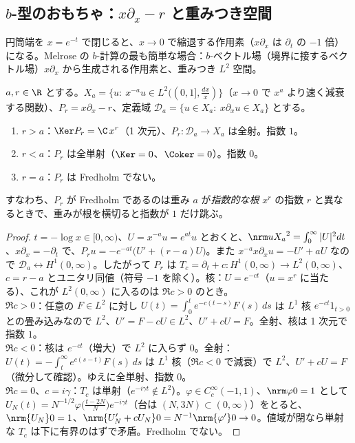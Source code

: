 \subsection{$b$-型のおもちゃ：$x\partial_x-r$ と重みつき空間}
円筒端を $x=e^{-t}$ で閉じると、$x\to0$ で縮退する作用素（$x\partial_x$ は $\partial_t$ の $-1$ 倍）になる。Melrose の $b$-計算の最も簡単な場合：$b$-ベクトル場（境界に接するベクトル場）$x\partial_x$ から生成される作用素と、重みつき $L^2$ 空間。
\begin{thm}\label{thm:toyb}\tP
$a,r\in\R$ とする。$X_a=\{u:\ x^{-a}u\in L^2((0,1],\tfrac{dx}x)\}$（$x\to0$ で $x^a$ より速く減衰する関数）、$P_r=x\partial_x-r$、定義域 $\mathcal D_a=\{u\in X_a:\ x\partial_xu\in X_a\}$ とする。
\begin{enumerate}
\item $r>a$：$\Ker P_r=\C\,x^r$（1 次元）、$P_r:\mathcal D_a\to X_a$ は全射。指数 $1$。
\item $r<a$：$P_r$ は全単射（$\Ker=0$、$\Coker=0$）。指数 $0$。
\item $r=a$：$P_r$ は Fredholm でない。
\end{enumerate}
すなわち、$P_r$ が Fredholm であるのは重み $a$ が\emph{指数的な根} $x^r$ の指数 $r$ と異なるときで、重みが根を横切ると指数が $1$ だけ跳ぶ。
\end{thm}
\begin{proof}
$t=-\log x\in[0,\infty)$、$U=x^{-a}u=e^{at}u$ とおくと、$\nrm u{X_a}^2=\int_0^\infty|U|^2dt$、$x\partial_x=-\partial_t$ で、$P_ru=-e^{-at}\bigl(U'+(r-a)U\bigr)$。また $x^{-a}x\partial_xu=-U'+aU$ なので $\mathcal D_a\leftrightarrow H^1(0,\infty)$。したがって $P_r$ は $T_c=\partial_t+c:H^1(0,\infty)\to L^2(0,\infty)$、$c=r-a$ とユニタリ同値（符号 $-1$ を除く）。核：$U=e^{-ct}$（$u=x^r$ に当たる）、これが $L^2(0,\infty)$ に入るのは $\Re c>0$ のとき。\\
$\Re c>0$：任意の $F\in L^2$ に対し $U(t)=\int_0^te^{-c(t-s)}F(s)\,ds$ は $L^1$ 核 $e^{-ct}1_{t>0}$ との畳み込みなので $L^2$、$U'=F-cU\in L^2$、$U'+cU=F$。全射、核は 1 次元で指数 $1$。\\
$\Re c<0$：核は $e^{-ct}$（増大）で $L^2$ に入らず $0$。全射：$U(t)=-\int_t^\infty e^{c(s-t)}F(s)\,ds$ は $L^1$ 核（$\Re c<0$ で減衰）で $L^2$、$U'+cU=F$（微分して確認）。ゆえに全単射、指数 $0$。\\
$\Re c=0$、$c=i\gamma$：$T_c$ は単射（$e^{-i\gamma t}\notin L^2$）。$\varphi\in C_c^\infty(-1,1)$、$\nrm\varphi0=1$ として $U_N(t)=N^{-1/2}\varphi\bigl(\tfrac{t-2N}N\bigr)e^{-i\gamma t}$（台は $(N,3N)\subset(0,\infty)$）をとると、$\nrm{U_N}0=1$、$\nrm{U_N'+cU_N}0=N^{-1}\nrm{\varphi'}0\to0$。値域が閉なら単射な $T_c$ は下に有界のはずで矛盾。Fredholm でない。
\end{proof}

